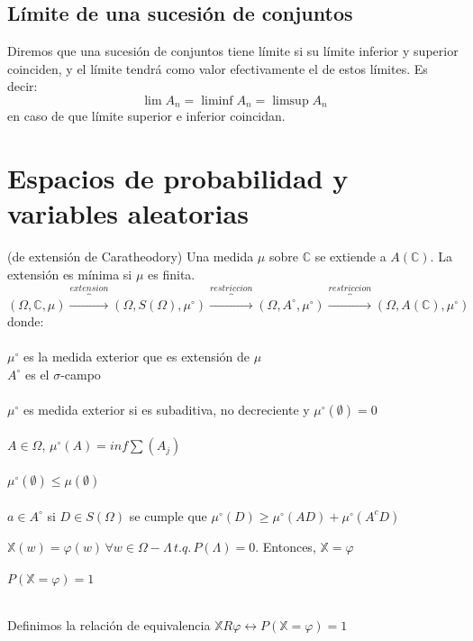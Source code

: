 \documentclass[12pt,a4paper,openright]{book}
\begin{document}
\subsection{Límite de una sucesión de conjuntos}
Diremos que una sucesión de conjuntos tiene límite si su límite inferior y superior coinciden, y el límite tendrá como valor efectivamente el de estos límites. Es decir: 
$$ \lim A_n = \liminf A_n = \limsup A_n $$ 
en caso de que límite superior e inferior coincidan.

\section{Espacios de probabilidad y variables aleatorias}
\begin{theorem} (de extensión de Caratheodory) 
Una medida $\mu$ sobre $\mathbb{C}$ se extiende a $A(\mathbb{C})$. La extensión es mínima si $\mu$ es finita.
$$(\Omega,\mathbb{C},\mu)\overbrace{\longrightarrow}^{extension}(\Omega,S(\Omega),\mu^\circ)\overbrace{\longrightarrow}^{restriccion}(\Omega,A^\circ,\mu^\circ)\overbrace{\longrightarrow}^{restriccion}(\Omega,A(\mathbb{C}),\mu^\circ)$$
donde:\\\\
$\mu^\circ$ es la medida exterior que es extensión de $\mu$\\
$A^\circ$ es el $\sigma$-campo\\\\
$\mu^\circ$ es medida exterior si es subaditiva, no decreciente y $\mu^\circ(\emptyset)=0$
\\\\
$A\in \Omega$, $\mu^\circ(A)=inf\displaystyle\sum(A_j)$\\\\
$\mu^\circ(\emptyset)\leq\mu(\emptyset)$\\\\
$a\in A^\circ$ si $D\in S(\Omega)$ se cumple que $\mu^\circ(D)\geq\mu^\circ(AD)+\mu^\circ(A^c D)$
\end{theorem}

\begin{lemma} 
$\mathbb{X}(w)=\varphi(w)\,\forall w \in \Omega - \Lambda\, t.q.\, P(\Lambda)=0$. Entonces, $\mathbb{X}=\varphi$ \\\\
$P(\mathbb{X}=\varphi)=1$\\\\
\end{lemma}
Definimos la relación de equivalencia $\mathbb{X}R\varphi\leftrightarrow P(\mathbb{X}=\varphi)=1$
\end{document}
